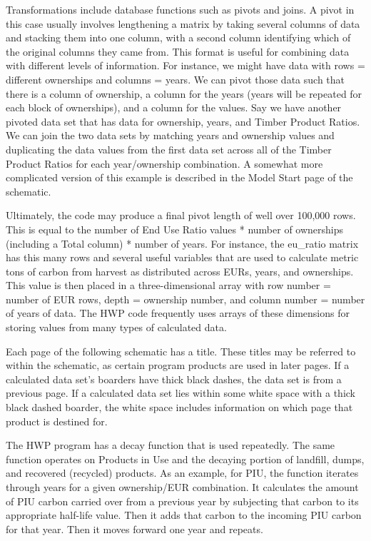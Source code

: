 \documentclass[
  openany]{book}
\begin{document}
Transformations include database functions such as pivots and joins. A pivot in this case usually involves lengthening a matrix by taking several columns of data and stacking them into one column, with a second column identifying which of the original columns they came from. This format is useful for combining data with different levels of information. For instance, we might have data with rows = different ownerships and columns = years. We can pivot those data such that there is a column of ownership, a column for the years (years will be repeated for each block of ownerships), and a column for the values. Say we have another pivoted data set that has data for ownership, years, and Timber Product Ratios. We can join the two data sets by matching years and ownership values and duplicating the data values from the first data set across all of the Timber Product Ratios for each year/ownership combination. A somewhat more complicated version of this example is described in the Model Start page of the schematic.

Ultimately, the code may produce a final pivot length of well over 100,000 rows. This is equal to the number of End Use Ratio values * number of ownerships (including a Total column) * number of years. For instance, the eu\_ratio matrix has this many rows and several useful variables that are used to calculate metric tons of carbon from harvest as distributed across EURs, years, and ownerships. This value is then placed in a three-dimensional array with row number = number of EUR rows, depth = ownership number, and column number = number of years of data. The HWP code frequently uses arrays of these dimensions for storing values from many types of calculated data.

Each page of the following schematic has a title. These titles may be referred to within the schematic, as certain program products are used in later pages. If a calculated data set's boarders have thick black dashes, the data set is from a previous page. If a calculated data set lies within some white space with a thick black dashed boarder, the white space includes information on which page that product is destined for.

The HWP program has a decay function that is used repeatedly. The same function operates on Products in Use and the decaying portion of landfill, dumps, and recovered (recycled) products. As an example, for PIU, the function iterates through years for a given ownership/EUR combination. It calculates the amount of PIU carbon carried over from a previous year by subjecting that carbon to its appropriate half-life value. Then it adds that carbon to the incoming PIU carbon for that year. Then it moves forward one year and repeats.
\end{document}
